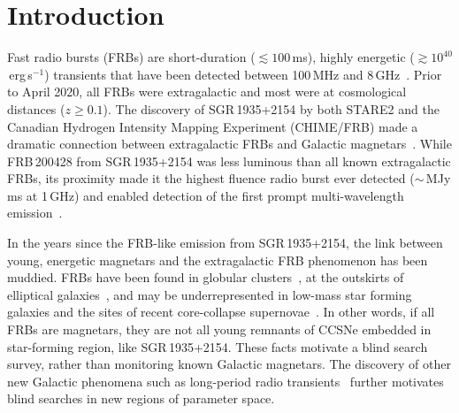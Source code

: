 \section{Introduction} \label{sec:intro}

Fast radio bursts (FRBs) are short-duration ($\lesssim 100$\,ms), highly energetic ($\gtrsim 10^{40}$\,erg\,s$^{-1}$) transients that have been detected between 100\,MHz and 8\,GHz~\cite{cordesFastRadioBursts2019, petroffFastRadioBursts2019}. 
Prior to April 2020, all FRBs were extragalactic and most were at cosmological distances ($z\geq0.1$).
The discovery of SGR\,1935+2154 by both STARE2 and the Canadian Hydrogen Intensity Mapping Experiment (CHIME/FRB) made a dramatic connection between extragalactic FRBs and Galactic magnetars~\cite{kirstenDetectionTwoBright2021,bochenekSTARE2DetectingFast2020}.
While FRB\,200428 from SGR\,1935+2154 was less luminous than all known extragalactic FRBs, its proximity made it the highest fluence radio burst ever detected ($\sim$\,MJy\,ms at 1\,GHz) and enabled detection of the first prompt multi-wavelength emission~\cite{mereghettiINTEGRALDiscoveryBurst2020}.

In the years since the FRB-like emission from SGR\,1935+2154, the link between young, energetic magnetars and the extragalactic FRB phenomenon has been muddied.
FRBs have been found in globular clusters~\cite{bhardwajNearbyRepeatingFast2021}, at the outskirts of elliptical galaxies~\cite{shahRepeatingFastRadio2025, eftekhariMassiveQuiescentElliptical2025}, and may be underrepresented in low-mass star forming galaxies and the sites of recent core-collapse supernovae~\cite{sharmaPreferentialOccurrenceFast2024}.
In other words, if all FRBs are magnetars, they are not all young remnants of CCSNe embedded in star-forming region, like SGR\,1935+2154.
These facts motivate a blind search survey, rather than monitoring known Galactic magnetars.
The discovery of other new Galactic phenomena such as long-period radio transients~\cite{hurley-walkerRadioTransientUnusually2022, calebEmissionstateswitchingRadioTransient2024, rodriguezSpectroscopicDetection29hour2025} further motivates blind searches in new regions of parameter space. 

